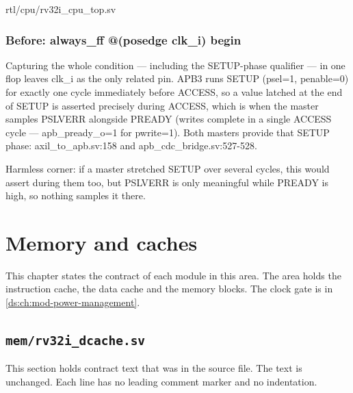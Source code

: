 \begin{relocated}{rtl/cpu/rv32i_cpu_top.sv}
\subsection*{Before: always\_ff @(posedge clk\_i) begin}

\begin{textblock}
Capturing the whole condition — including the SETUP-phase qualifier — in
one flop leaves clk_i as the only related pin. APB3 runs SETUP (psel=1,
penable=0) for exactly one cycle immediately before ACCESS, so a value
latched at the end of SETUP is asserted precisely during ACCESS, which is
when the master samples PSLVERR alongside PREADY (writes complete in a
single ACCESS cycle — apb_pready_o=1 for pwrite=1). Both masters provide
that SETUP phase: axil_to_apb.sv:158 and apb_cdc_bridge.sv:527-528.

Harmless corner: if a master stretched SETUP over several cycles, this
would assert during them too, but PSLVERR is only meaningful while PREADY
is high, so nothing samples it there.
\end{textblock}

\end{relocated}








\chapter{Memory and caches}\label{ds:ch:mod-memory-and-caches}

This chapter states the contract of each module in this area. The area holds the instruction cache, the data cache and the memory blocks. The clock gate  is in \cref{ds:ch:mod-power-management}.

\section{\texttt{mem/rv32i\_dcache.sv}}\label{ds:mod:rv32i-dcache}

This section holds contract text that was in the source file. The text is unchanged. Each line has no leading comment marker and no indentation.

